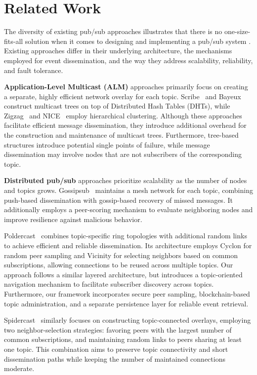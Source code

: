 \section{Related Work}
\label{sec:related-work}

The diversity of existing pub/sub approaches illustrates that there is no one-size-fits-all solution when it comes to designing and implementing a pub/sub system \cite{FacesOfPubSub, XlPubSub}.
Existing approaches differ in their underlying architecture, the mechanisms employed for event dissemination, and the way they address scalability, reliability, and fault tolerance. 

\textbf{Application-Level Multicast (ALM)} approaches primarily focus on creating a separate, highly efficient network overlay for each topic. Scribe~\cite{Scribe} and Bayeux~\cite{Bayeux} construct multicast trees on top of Distributed Hash Tables (DHTs), while Zigzag~\cite{ZigZag} and NICE~\cite{Nice} employ hierarchical clustering. 
Although these approaches facilitate efficient message dissemination, they introduce additional overhead for the construction and maintenance of multicast trees.
Furthermore, tree-based structures introduce potential single points of failure, while message dissemination may involve nodes that are not subscribers of the corresponding topic.

\textbf{Distributed pub/sub} approaches prioritize scalability as the number of nodes and topics grows. 
Gossipsub~\cite{GossipSub} maintains a mesh network for each topic, combining push-based dissemination with gossip-based recovery of missed messages.
It additionally employs a peer-scoring mechanism to evaluate neighboring nodes and improve resilience against malicious behavior.

Poldercast~\cite{Poldercast} combines topic-specific ring topologies with additional random links to achieve efficient and reliable dissemination. 
Its architecture employs Cyclon for random peer sampling and Vicinity for selecting neighbors based on common subscriptions, allowing connections to be reused across multiple topics. 
Our approach follows a similar layered architecture, but introduces a topic-oriented navigation mechanism to facilitate subscriber discovery across topics. 
Furthermore, our framework incorporates secure peer sampling, blockchain-based topic administration, and a separate persistence layer for reliable event retrieval.

Spidercast~\cite{Spidercast} similarly focuses on constructing topic-connected overlays, employing two neighbor-selection strategies: favoring peers with the largest number of common subscriptions, and maintaining random links to peers sharing at least one topic. 
This combination aims to preserve topic connectivity and short dissemination paths while keeping the number of maintained connections moderate.

